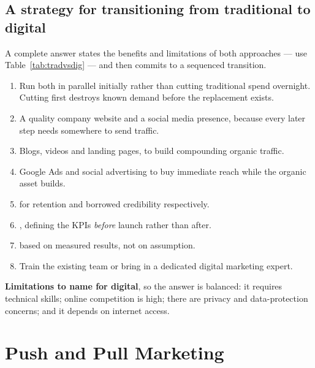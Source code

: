 \documentclass{MMTextbook}
\begin{document}
\subsection{A strategy for transitioning from traditional to digital}

\begin{exambox}
A complete answer states the benefits and limitations of both approaches ---
use Table~\ref{tab:tradvsdig} --- and then commits to a sequenced transition.

\begin{enumerate}
\item {} Run both in parallel initially rather
      than cutting traditional spend overnight. Cutting first destroys known
      demand before the replacement exists.
\item {} A quality company website and a social
      media presence, because every later step needs somewhere to send traffic.
\item {} Blogs, videos and landing
      pages, to build compounding organic traffic.
\item {} Google Ads and social advertising to
      buy immediate reach while the organic asset builds.
\item {} for retention and
      borrowed credibility respectively.
\item {}, defining the KPIs
      \emph{before} launch rather than after.
\item {} based on measured results,
      not on assumption.
\item {} Train the existing team or bring in a dedicated
      digital marketing expert.
\end{enumerate}

\smallskip
\textbf{Limitations to name for digital}, so the answer is balanced: it
requires technical skills; online competition is high; there are privacy and
data-protection concerns; and it depends on internet access.
\end{exambox}

\section{Push and Pull Marketing}
\end{document}
